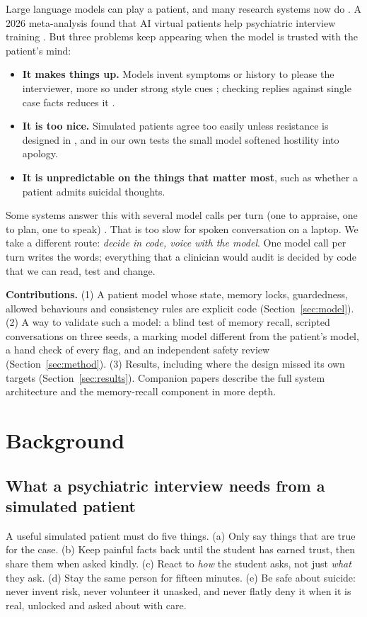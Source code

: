\documentclass[manuscript, screen, review]{jair}
\begin{document}
Large language models can play a patient, and many research systems now do
\citep{chen2023llmempowered,wang2024patient,lee2025psyche,sabour2026patientact,sabour2026patienthub,louie2024roleplaydoh}. A 2026 meta-analysis
found that AI virtual patients help psychiatric interview training \citep{kilincel2026meta}. But three problems keep appearing when the
model is trusted with the patient's mind:
\begin{itemize}
\item \textbf{It makes things up.} Models invent symptoms or history to please the interviewer, more so under strong style cues \citep{chen2023llmempowered}; checking
replies against single case facts reduces it \citep{lai2025patientzero}.
\item \textbf{It is too nice.} Simulated patients agree too easily unless resistance is designed in \citep{steenstra2025scaffolding,lee2025psyche}, and in our
own tests the small model softened hostility into apology.
\item \textbf{It is unpredictable on the things that matter most}, such as whether a patient admits suicidal thoughts.
\end{itemize}

Some systems answer this with several model calls per turn (one to appraise, one to plan, one to speak) \citep{sabour2026patientact}. That is
too slow for spoken conversation on a laptop. We take a different route: \emph{decide in code, voice with the model}. One model call per turn
writes the words; everything that a clinician would audit is decided by code that we can read, test and change.

\textbf{Contributions.} (1) A patient model whose state, memory locks, guardedness, allowed behaviours and consistency rules are explicit code
(Section~\ref{sec:model}). (2) A way to validate such a model: a blind test of memory recall, scripted conversations on three seeds, a
marking model different from the patient's model, a hand check of every flag, and an independent safety review
(Section~\ref{sec:method}). (3) Results, including where the design missed its own targets (Section~\ref{sec:results}). Companion papers
describe the full system architecture and the memory-recall component in more depth.

\section{Background}
\subsection{What a psychiatric interview needs from a simulated patient}
A useful simulated patient must do five things. (a) Only say things that are true for the case. (b) Keep painful facts back until the student has earned trust, then share them when asked kindly. (c) React to \emph{how} the student asks, not just \emph{what} they ask. (d) Stay the same person for fifteen minutes. (e) Be safe about suicide: never invent risk, never volunteer it unasked, and never flatly deny it when it is real, unlocked and asked about with care.
\end{document}

